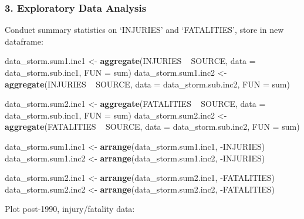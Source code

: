\documentclass[]{article}
\newenvironment{Shaded}{\begin{snugshade}}{\end{snugshade}}
\newcommand{\KeywordTok}[1]{\textcolor[rgb]{0.13,0.29,0.53}{\textbf{{#1}}}}
\newcommand{\DataTypeTok}[1]{\textcolor[rgb]{0.13,0.29,0.53}{{#1}}}
\newcommand{\StringTok}[1]{\textcolor[rgb]{0.31,0.60,0.02}{{#1}}}
\newcommand{\NormalTok}[1]{{#1}}
\begin{document}
\subsubsection{3. Exploratory Data
Analysis}\label{exploratory-data-analysis}

Conduct summary statistics on `INJURIES' and `FATALITIES', store in new
dataframe:

\begin{Shaded}
\begin{Highlighting}[]
\NormalTok{data_storm.sum1.inc1 <-}\StringTok{ }\KeywordTok{aggregate}\NormalTok{(INJURIES ~}\StringTok{ }\NormalTok{SOURCE, }\DataTypeTok{data =} \NormalTok{data_storm.sub.inc1, }\DataTypeTok{FUN =} \NormalTok{sum)}
\NormalTok{data_storm.sum1.inc2 <-}\StringTok{ }\KeywordTok{aggregate}\NormalTok{(INJURIES ~}\StringTok{ }\NormalTok{SOURCE, }\DataTypeTok{data =} \NormalTok{data_storm.sub.inc2, }\DataTypeTok{FUN =} \NormalTok{sum)}

\NormalTok{data_storm.sum2.inc1 <-}\StringTok{ }\KeywordTok{aggregate}\NormalTok{(FATALITIES ~}\StringTok{ }\NormalTok{SOURCE, }\DataTypeTok{data =} \NormalTok{data_storm.sub.inc1, }\DataTypeTok{FUN =} \NormalTok{sum)}
\NormalTok{data_storm.sum2.inc2 <-}\StringTok{ }\KeywordTok{aggregate}\NormalTok{(FATALITIES ~}\StringTok{ }\NormalTok{SOURCE, }\DataTypeTok{data =} \NormalTok{data_storm.sub.inc2, }\DataTypeTok{FUN =} \NormalTok{sum)}

\NormalTok{data_storm.sum1.inc1 <-}\StringTok{ }\KeywordTok{arrange}\NormalTok{(data_storm.sum1.inc1, -INJURIES)}
\NormalTok{data_storm.sum1.inc2 <-}\StringTok{ }\KeywordTok{arrange}\NormalTok{(data_storm.sum1.inc2, -INJURIES)}

\NormalTok{data_storm.sum2.inc1 <-}\StringTok{ }\KeywordTok{arrange}\NormalTok{(data_storm.sum2.inc1, -FATALITIES)}
\NormalTok{data_storm.sum2.inc2 <-}\StringTok{ }\KeywordTok{arrange}\NormalTok{(data_storm.sum2.inc2, -FATALITIES)}
\end{Highlighting}
\end{Shaded}

Plot post-1990, injury/fatality data:
\end{document}
